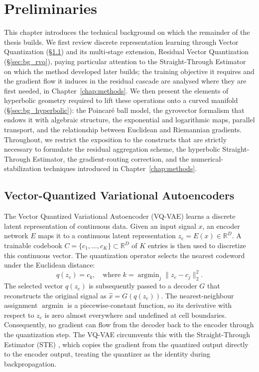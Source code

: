 \documentclass[12pt]{report}
\begin{document}
\chapter{Preliminaries}
\label{chap:background}

This chapter introduces the technical background on which the remainder of the thesis builds. We first review discrete representation learning through Vector Quantization (\S\ref{sec:bg_vq}) and its multi-stage extension, Residual Vector Quantization (\S\ref{sec:bg_rvq}), paying particular attention to the Straight-Through Estimator on which the method developed later builds; the training objective it requires and the gradient flow it induces in the residual cascade are analysed where they are first needed, in Chapter~\ref{chap:methods}. We then present the elements of hyperbolic geometry required to lift these operations onto a curved manifold (\S\ref{sec:bg_hyperbolic}): the Poincar\'e ball model, the gyrovector formalism that endows it with algebraic structure, the exponential and logarithmic maps, parallel transport, and the relationship between Euclidean and Riemannian gradients. Throughout, we restrict the exposition to the constructs that are strictly necessary to formulate the residual aggregation scheme, the hyperbolic Straight-Through Estimator, the gradient-routing correction, and the numerical-stabilization techniques introduced in Chapter~\ref{chap:methods}.

\section{Vector-Quantized Variational Autoencoders}
\label{sec:bg_vq}
The Vector Quantized Variational Autoencoder (VQ-VAE) \cite{vqvae} learns a discrete latent representation of continuous data. Given an input signal $x$, an encoder network $E$ maps it to a continuous latent representation $z_e = E(x) \in \mathbb{R}^D$. A trainable codebook $C = \{c_1, \dots, c_K\} \subset \mathbb{R}^D$ of $K$ entries is then used to discretize this continuous vector. The quantization operator selects the nearest codeword under the Euclidean distance:
\begin{equation}
    q(z_e) = c_k, \quad \text{where } k = \operatorname{argmin}_j \| z_e - c_j \|^2_2.
\end{equation}
The selected vector $q(z_e)$ is subsequently passed to a decoder $G$ that reconstructs the original signal as $\hat{x} = G(q(z_e))$. The nearest-neighbour assignment $\operatorname{argmin}$ is a piecewise-constant function, so its derivative with respect to $z_e$ is zero almost everywhere and undefined at cell boundaries. Consequently, no gradient can flow from the decoder back to the encoder through the quantization step. The VQ-VAE circumvents this with the Straight-Through Estimator (STE) \cite{straight_through_estimator}, which copies the gradient from the quantized output directly to the encoder output, treating the quantizer as the identity during backpropagation.
\end{document}
